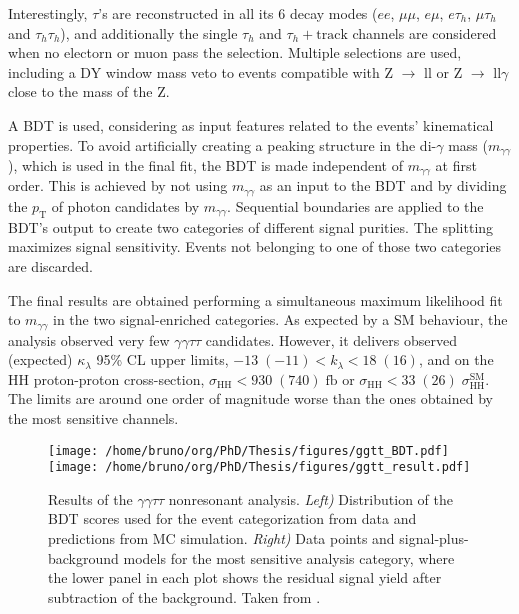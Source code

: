 \documentclass[11pt]{article}
\newcommand{\kl}{\kappa_{\lambda}}
\newcommand{\mgg}{m_{\gamma\gamma}}
\newcommand{\pt}{p_{\text{T}}}
\newcommand{\zllg}{Z $\rightarrow$ ll$\gamma$}
\newcommand{\zll}{Z $\rightarrow$ ll}
\begin{document}
Interestingly, \(\tau\)’s are reconstructed in all its 6 decay modes (\(ee\), \(\mu\mu\), \(e\mu\), \(e\tau_{h}\), \(\mu\tau_{h}\) and \(\tau_{h}\tau_{h}\)), and additionally the single \(\tau_{h}\) and \(\tau_{h}+\text{track}\) channels are considered when no electorn or muon pass the selection.
Multiple selections are used, including a DY window mass veto to events compatible with \zll{} or \zllg{} close to the mass of the Z.

A \ac{BDT} is used, considering as input features related to the events' kinematical properties.
To avoid artificially creating a peaking structure in the di-\(\gamma\) mass (\(\mgg\)), which is used in the final fit, the \ac{BDT} is made independent of \(\mgg\) at first order.
This is achieved by not using \(\mgg\) as an input to the \ac{BDT} and by dividing the \(\pt\) of photon candidates by \(\mgg\).
Sequential boundaries are applied to the \ac{BDT}'s output to create two categories of different signal purities.
The splitting maximizes signal sensitivity.
Events not belonging to one of those two categories are discarded.

The final results are obtained performing a simultaneous maximum likelihood fit to \(\mgg\) in the two signal-enriched categories.
As expected by a SM behaviour, the analysis observed very few \(\gamma \gamma \tau \tau\) candidates.
However, it delivers observed (expected) \(\kl\) 95\% \ac{CL} upper limits, \(-13\;(-11) < k_{\lambda} < 18\;(16)\), and on the HH proton-proton cross-section, \(\sigma_{\text{HH}} < 930\;(740)\;\si{\femto\barn}\) or \(\sigma_{\text{HH}} < 33\;(26)\;\sigma_{\text{HH}}^{\text{SM}}\).
The limits are around one order of magnitude worse than the ones obtained by the most sensitive channels.

\begin{figure}
\texttt{[image: /home/bruno/org/PhD/Thesis/figures/ggtt\_BDT.pdf]}
\texttt{[image: /home/bruno/org/PhD/Thesis/figures/ggtt\_result.pdf]}
\caption{\label{fig:ggtt_results}Results of the \(\gamma \gamma \tau \tau\) nonresonant analysis. \emph{Left)} Distribution of the BDT scores used for the event categorization from data and predictions from MC simulation. \emph{Right)} Data points and signal-plus-background models for the most sensitive analysis category, where the lower panel in each plot shows the residual signal yield after subtraction of the background. Taken from \cite{gammagammatautau}.}
\end{figure}
\end{document}
